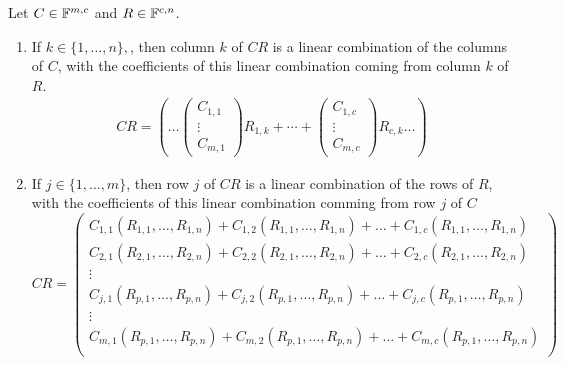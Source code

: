 \begin{thm}
  Let $C\in\mathbb{F}^{m,c}$ and $R\in\mathbb{F}^{c,n}$.
  \begin{enumerate}
    \item If $k \in \{1,\ldots,n\},$, then column $k$ of $CR$ is a linear combination of the columns of $C$, with the coefficients of this linear combination coming from column $k$ of $R$.
    \begin{equation}
\begin{aligned}
        CR = 
      \left (
        \ldots
        \left(\begin{matrix}C_{1,1}\\ \vdots \\ C_{m,1} \end{matrix}\right) R_{1,k}+ \cdots + \left(\begin{matrix}C_{1,c}\\ \vdots \\ C_{m,c} \end{matrix}\right) R_{c,k}
        \ldots
      \right)
\end{aligned}
    \end{equation}
    \item If $j\in \{1, \ldots, m\}$, then row $j$ of $CR$ is a linear combination of the rows of $R$, with the coefficients of this linear combination comming from row $j$ of $C$
    \begin{equation}
      CR = 
      \left(
        \begin{matrix}
          C_{1,1} (R_{1,1}, \ldots, R_{1,n}) + C_{1,2} (R_{1,1}, \ldots, R_{1,n}) + \ldots + C_{1,c} (R_{1,1}, \ldots, R_{1,n}) \\
          C_{2,1} (R_{2,1}, \ldots, R_{2,n}) + C_{2,2} (R_{2,1}, \ldots, R_{2,n}) + \ldots + C_{2,c} (R_{2,1}, \ldots, R_{2,n}) \\
          \vdots \\
          C_{j,1} (R_{p,1}, \ldots, R_{p,n}) + C_{j,2} (R_{p,1}, \ldots, R_{p,n}) + \ldots + C_{j,c} (R_{p,1}, \ldots, R_{p,n}) \\
          \vdots \\
          C_{m,1} (R_{p,1}, \ldots, R_{p,n}) + C_{m,2} (R_{p,1}, \ldots, R_{p,n}) + \ldots + C_{m,c} (R_{p,1}, \ldots, R_{p,n}) \\
        \end{matrix}
      \right)
    \end{equation}
  \end{enumerate}
\end{thm}

